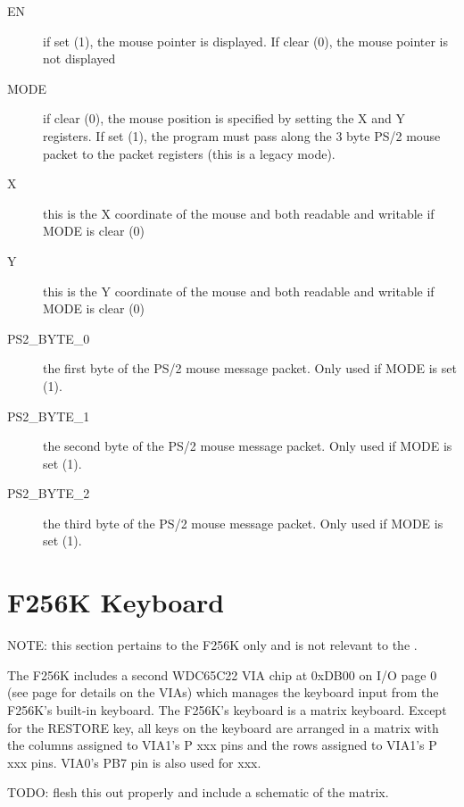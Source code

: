 \begin{description}
    \item[EN] if set (1), the mouse pointer is displayed. If clear (0), the mouse pointer is not displayed
    \item[MODE] if clear (0), the mouse position is specified by setting the X and Y registers. If set (1), the program must pass along the 3 byte PS/2 mouse packet to the packet registers (this is a legacy mode).
    \item[X] this is the X coordinate of the mouse and both readable and writable if MODE is clear (0)
    \item[Y] this is the Y coordinate of the mouse and both readable and writable if MODE is clear (0)
    \item[PS2\_BYTE\_0] the first byte of the PS/2 mouse message packet. Only used if MODE is set (1).
    \item[PS2\_BYTE\_1] the second byte of the PS/2 mouse message packet. Only used if MODE is set (1).
    \item[PS2\_BYTE\_2] the third byte of the PS/2 mouse message packet. Only used if MODE is set (1).
\end{description}

\section*{F256K Keyboard}
\label{sec_f256k_kbd}

\begin{leftbar}
    NOTE: this section pertains to the F256K only and is not relevant to the \jr.
\end{leftbar}

The F256K includes a second WDC65C22 VIA chip at 0xDB00 on I/O page 0 (see page \pageref{chap_via} for details on the VIAs) which manages the keyboard input from the F256K's built-in keyboard. The F256K's keyboard is a matrix keyboard. Except for the RESTORE key, all keys on the keyboard are arranged in a matrix with the columns assigned to VIA1's P xxx pins and the rows assigned to VIA1's P xxx pins. VIA0's PB7 pin is also used for xxx.

\begin{leftbar}
    TODO: flesh this out properly and include a schematic of the matrix.
\end{leftbar}